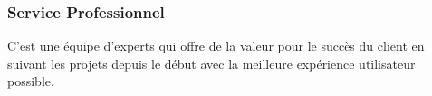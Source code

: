 \subsubsection{Service Professionnel}
C'est une équipe d'experts qui offre de la valeur pour le succès du client en
suivant les projets depuis le début avec la meilleure expérience utilisateur possible.
